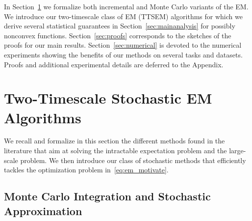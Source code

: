 \documentclass[12pt]{article}
\begin{document}

In Section~\ref{sec:tts} we formalize both incremental and Monte Carlo variants of the EM. 
We introduce our two-timescale class of EM (TTSEM) algorithms for which we derive several statistical guarantees in Section~\ref{sec:mainanalysis} for possibly {nonconvex} functions.
Section~\ref{sec:proofs} corresponds to the sketches of the proofs for our main results.
Section~\ref{sec:numerical} is devoted to the numerical experiments showing the benefits of our methods on several tasks and datasets.
Proofs and additional experimental details are deferred to the Appendix.


\section{Two-Timescale Stochastic EM Algorithms}\label{sec:tts}


We recall and formalize in this section the different methods found in the literature that aim at solving the intractable expectation problem and the large-scale problem. 
We then introduce our class of stochastic methods that efficiently tackles the optimization problem in~\eqref{eq:em_motivate}.


\subsection{Monte Carlo Integration and Stochastic Approximation} 
\end{document}

